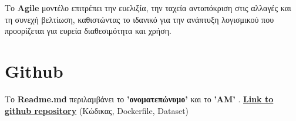 \documentclass{article}
\begin{document}
Το \textbf{Agile} μοντέλο επιτρέπει την ευελιξία, την ταχεία ανταπόκριση στις αλλαγές και τη συνεχή βελτίωση, καθιστώντας το ιδανικό για την ανάπτυξη λογισμικού που προορίζεται για ευρεία διαθεσιμότητα και χρήση.
% 
\section{Github}
Tο \textbf{Readme.md} περιλαμβάνει το \textbf{'ονοματεπώνυμο'} και το \textbf{'ΑΜ'} .
\newline
\href{https://github.com/mikezois1992/algorithms_ml}{\textbf{Link to github repository}} (Κώδικας, Dockerfile, Dataset)
\end{document}
